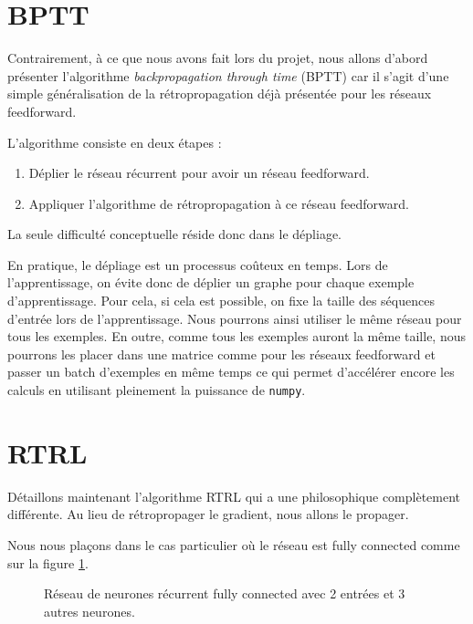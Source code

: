 \section{BPTT}

Contrairement, à ce que nous avons fait lors du projet, nous allons d'abord présenter l'algorithme \textit{backpropagation through time} (BPTT) car il s'agit d'une simple généralisation de la rétropropagation déjà présentée pour les réseaux feedforward.

L'algorithme consiste en deux étapes :
\begin{enumerate}
\item Déplier le réseau récurrent pour avoir un réseau feedforward.
\item Appliquer l'algorithme de rétropropagation à ce réseau feedforward.
\end{enumerate}

La seule difficulté conceptuelle réside donc dans le dépliage.

En pratique, le dépliage est un processus coûteux en temps. Lors de l'apprentissage, on évite donc de déplier un graphe pour chaque exemple d'apprentissage. Pour cela, si cela est possible, on fixe la taille des séquences d'entrée lors de l'apprentissage. Nous pourrons ainsi utiliser le même réseau pour tous les exemples. En outre, comme tous les exemples auront la même taille, nous pourrons les placer dans une matrice comme pour les réseaux feedforward et passer un batch d'exemples en même temps ce qui permet d'accélérer encore les calculs en utilisant pleinement la puissance de \texttt{numpy}.

\section{RTRL}

\label{RTRL_section}

Détaillons maintenant l'algorithme RTRL qui a une philosophique complètement différente. Au lieu de rétropropager le gradient, nous allons le propager.

Nous nous plaçons dans le cas particulier où le réseau est fully connected comme sur la figure \ref{fully_connected_recurrent_network}. 

\begin{figure}
\begin{center}

\caption{Réseau de neurones récurrent fully connected avec 2 entrées et 3 autres neurones.}
\label{fully_connected_recurrent_network}
\end{center}
\end{figure}

